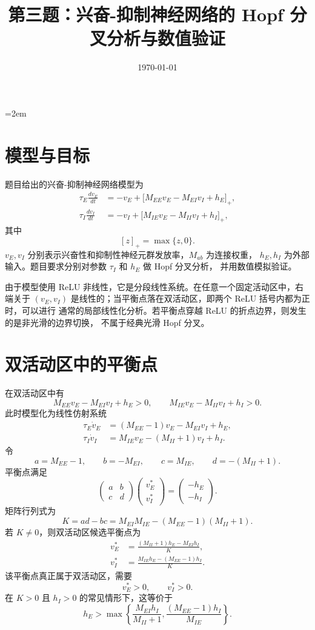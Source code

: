 \documentclass[UTF8]{ctexart}
\title{第三题：兴奋-抑制神经网络的 Hopf 分叉分析与数值验证}
\author{}
\date{\today}
\begin{document}
\emergencystretch=2em
\maketitle

\section{模型与目标}

题目给出的兴奋-抑制神经网络模型为
\begin{align}
\tau_E\frac{dv_E}{dt}
&=-v_E+\bigl[M_{EE}v_E-M_{EI}v_I+h_E\bigr]_+,
\label{eq:model_e}\\
\tau_I\frac{dv_I}{dt}
&=-v_I+\bigl[M_{IE}v_E-M_{II}v_I+h_I\bigr]_+,
\label{eq:model_i}
\end{align}
其中
\[
[z]_+=\max\{z,0\}.
\]
$v_E,v_I$ 分别表示兴奋性和抑制性神经元群发放率，$M_{ab}$ 为连接权重，
$h_E,h_I$ 为外部输入。题目要求分别对参数 $\tau_I$ 和 $h_E$ 做 Hopf 分叉分析，
并用数值模拟验证。

由于模型使用 ReLU 非线性，它是分段线性系统。在任意一个固定活动区中，右端关于
$(v_E,v_I)$ 是线性的；当平衡点落在双活动区，即两个 ReLU 括号内都为正时，可以进行
通常的局部线性化分析。若平衡点穿越 ReLU 的折点边界，则发生的是非光滑的边界切换，
不属于经典光滑 Hopf 分叉。

\section{双活动区中的平衡点}

在双活动区中有
\[
M_{EE}v_E-M_{EI}v_I+h_E>0,\qquad
M_{IE}v_E-M_{II}v_I+h_I>0.
\]
此时模型化为线性仿射系统
\begin{align}
\tau_E\dot v_E
&=(M_{EE}-1)v_E-M_{EI}v_I+h_E,\\
\tau_I\dot v_I
&=M_{IE}v_E-(M_{II}+1)v_I+h_I.
\end{align}
令
\[
a=M_{EE}-1,\qquad b=-M_{EI},\qquad
c=M_{IE},\qquad d=-(M_{II}+1).
\]
平衡点满足
\[
\begin{pmatrix}
a & b\\
c & d
\end{pmatrix}
\begin{pmatrix}
v_E^*\\v_I^*
\end{pmatrix}
=
\begin{pmatrix}
-h_E\\-h_I
\end{pmatrix}.
\]
矩阵行列式为
\[
K=ad-bc=M_{EI}M_{IE}-(M_{EE}-1)(M_{II}+1).
\]
若 $K\ne0$，则双活动区候选平衡点为
\begin{align}
v_E^*
&=\frac{(M_{II}+1)h_E-M_{EI}h_I}{K},
\label{eq:eq_ve}\\
v_I^*
&=\frac{M_{IE}h_E-(M_{EE}-1)h_I}{K}.
\label{eq:eq_vi}
\end{align}
该平衡点真正属于双活动区，需要
\[
v_E^*>0,\qquad v_I^*>0.
\]
在 $K>0$ 且 $h_I>0$ 的常见情形下，这等价于
\begin{equation}
h_E>
\max\left\{
\frac{M_{EI}h_I}{M_{II}+1},
\frac{(M_{EE}-1)h_I}{M_{IE}}
\right\}.
\label{eq:active_boundary}
\end{equation}
\end{document}
